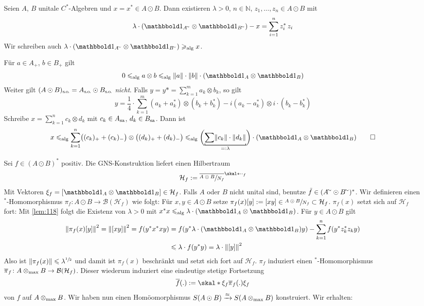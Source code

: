 \begin{lemma}[label=lem:118]
	Seien $A$, $B$ unitale $C^*$-Algebren und $x=x^* \in A \odot B$.
	Dann existieren $\lambda > 0$, $n \in \mathbb{N}$, $z_1, \ldots ,z_n \in A \odot B$ mit 
	\[
		\lambda \cdot \enbrace*{\ind_{A^\simm} \otimes \ind_{B^\simm}} -x = \sum_{i=1}^{n} z_i^* \, z_i
	\]
	Wir schreiben auch $\lambda \cdot \enbrace*{\ind_{A^\simm} \otimes \ind_{B^\simm}} \ge_{\alg} x$.
\end{lemma}
\begin{beweis}
	Für $a \in A_+$, $b \in B_+$ gilt
	\[
		0 \le_\alg a \otimes b \le_\alg \norm*{a} \cdot \norm*{b} \cdot \enbrace*{\ind_A \otimes \ind_B}
	\]
	Weiter gilt $(A \odot B)_\so = A_\so \odot B_\so$ \emph{nicht}.
	Falls $y=y* = \sum_{k=1}^{m} a_k \otimes b_k$, so gilt
	\[
		y= \frac{1}{4} \cdot \sum_{k=1}^{m} (a_k +a_k^*) \otimes (b_k + b_k^*) - i (a_k - a_k^*) \otimes i \cdot (b_k -b_k^*)
	\]
	Schreibe $x= \sum_{k=1}^{n} c_k \otimes d_k$ mit $c_k \in A_\sa$, $d_k \in B_\sa$.
	Dann ist 
	\[
		x \le_\alg \sum_{k=1}^{n} \enbrace[\big]{(c_k)_+ + (c_k)_-} \otimes  \enbrace[\big]{(d_k)_+ + (d_k)_-} \le_\alg \enbrace[\bigg]{\Underbracket{\sum \norm*{c_k} \cdot \norm*{d_k}}{=: \lambda} } \cdot \enbrace*{\ind_A \otimes \ind_B} \qedhere
	\]
\end{beweis}

Sei $f \in (A \odot B)^*$ positiv. 
Die GNS-Konstruktion liefert einen Hilbertraum 
\[
	\mathcal{H}_f := \overline{\sfrac{A \odot B}{N_f}}^{\skal*{\cdot}{\cdot }_f}
\]
Mit Vektoren $\xi_f = \benbrace*{\ind_A \otimes \ind_B} \in \mathcal{H}_f$.
Falls $A$ oder $B$ nicht unital sind, benutze $\tilde{f} \in (A^\simm \odot B^\simm)^*$.
Wir definieren einen $^*$-Homomorphismus $\pi_f \colon A \odot B \to \mathcal{B}(\mathcal{H}_f)$ wie folgt:
Für $x,y \in A \odot B$ setze $\pi_f(x)[y] := [xy] \in \sfrac{A \odot B}{N_f} \subset \mathcal{H}_f$.
$\pi_f(x)$ setzt sich auf $\mathcal{H}_f$ fort: 
Mit \autoref{lem:118} folgt die Existenz von $\lambda>0$ mit $x^*x \le_\alg \lambda \cdot (\ind_{A} \otimes \ind_B)$.
Für $y \in A \odot B$ gilt 
\begin{align}
	\norm*{\pi_f(x)[y]}^2 = \norm*{[xy]}^2 = f \enbrace*{y^* x^*x y} &= f \enbrace*{y^* \lambda  \cdot (\ind_{A} \otimes \ind_B) y} - \sum_{k=1}^{n} f \enbrace*{y^* z_k^* z_k y}\\
	&\le \lambda \cdot 	f(y^* y) = \lambda \cdot \norm*{[y]}^2
\end{align}
Also ist $\norm*{\pi_f(x)} \le \lambda^{\sfrac{1}{2}}$ und damit ist $\pi_f(x)$ beschränkt und setzt sich fort auf $\mathcal{H}_f$.
$\pi_f$ induziert einen $^*$-Homomorphismus $\overline{\pi}_f \colon A \tensormax B \to \mathcal{B}(\mathcal{H}_f)$.
Dieser wiederum induziert eine eindeutige stetige Fortsetzung 
\[
	\overline{f}( .) := \skal*{\xi_f}{\overline{\pi}_f(.) \xi_f}
\]
von $f$ auf $A \tensormax B$.
Wir haben nun einen Homöomorphismus $S(A \odot B) \xrightarrow{\approx} S(A \tensormax B)$ konstruiert.
Wir erhalten:

